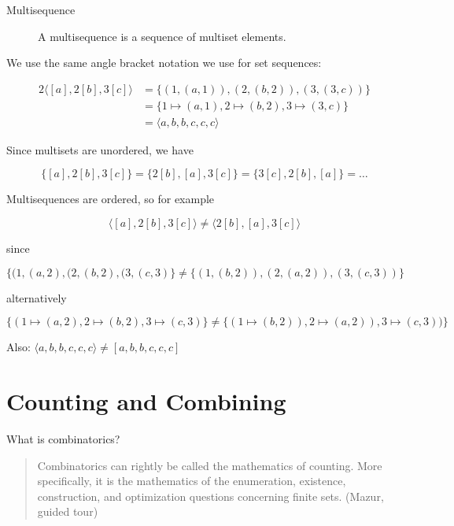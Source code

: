 \documentclass[reqno,12pt]{tufte-book}
\numberwithin{equation}{subsection}
\begin{document}
\begin{description}
\item [Multisequence]  A multisequence is a sequence of multiset elements.
\end{description}

We use the same angle bracket notation we use for set sequences:

\begin{alignat}{2}
  \langle [a],2[b],3[c]\rangle &= \{(1, (a,1)), (2,(b,2)), (3,(3,c))\} \\
  &= \{1\mapsto (a,1), 2\mapsto (b,2), 3\mapsto (3,c)\} \\
  &= \langle a,b,b,c,c,c\rangle
\end{alignat}

Since multisets are unordered, we have

\begin{equation}
  \{[a],2[b],3[c]\} = \{2[b],[a],3[c]\} = \{3[c],2[b],[a]\} = \ldots
\end{equation}

Multisequences are ordered, so for example

\begin{equation}
  \langle [a],2[b],3[c]\rangle \neq \langle2[b],[a],3[c]\rangle
\end{equation}

\noindent since

\begin{equation}
  \{(1,(a,2), (2,(b,2), (3,(c,3)\}\neq \{(1,(b,2)), (2,(a,2)), (3,(c,3))\}
\end{equation}

\noindent alternatively

\begin{equation}
  \{(1\mapsto (a,2), 2\mapsto (b,2), 3\mapsto (c,3)\} 
  \neq \{(1\mapsto (b,2)), 2\mapsto (a,2)), 3\mapsto (c,3))\}
\end{equation}

Also:  $\langle a,b,b,c,c,c\rangle \neq [a,b,b,c,c,c]$

\chapter{Counting and Combining}

\cite{berge_principles_1971}

What is combinatorics?

\blockquote{Combinatorics can rightly be called the mathematics of counting. More speciﬁcally, it
is the mathematics of the enumeration, existence, construction, and optimization questions
concerning ﬁnite sets. (Mazur, guided tour)}
\end{document}
